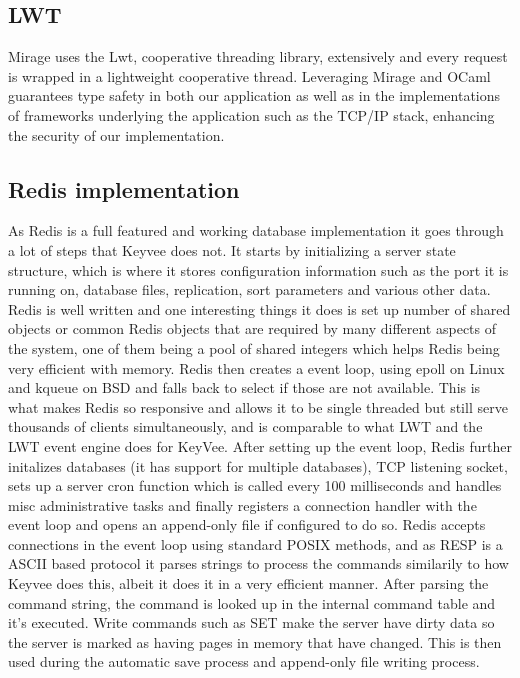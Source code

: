 \documentclass[english,10pt,twocolumn]{article}
\begin{document}
\subsection{LWT}

Mirage uses the Lwt, cooperative threading library, extensively and every request is wrapped in a lightweight cooperative thread. Leveraging Mirage and OCaml guarantees type safety in both our application as well as in the implementations of frameworks underlying the application such as the TCP/IP stack, enhancing the security of our implementation.


\subsection{Redis implementation}

As Redis is a full featured and working database implementation it goes through a lot of steps that Keyvee does not.
It starts by initializing a server state structure, which is where it stores configuration information such as the port it is running on, database files, replication, sort parameters and various other data.
Redis is well written and one interesting things it does is set up number of shared objects or common Redis objects that are required by many different aspects of the system, one of them being a pool of shared integers which helps Redis being very efficient with memory.
Redis then creates a event loop, using epoll on Linux and kqueue on BSD and falls back to select if those are not available.
This is what makes Redis so responsive and allows it to be single threaded but still serve thousands of clients simultaneously, and is comparable to what LWT and the LWT event engine does for KeyVee.
After setting up the event loop, Redis further initalizes databases (it has support for multiple databases), TCP listening socket, sets up a server cron function which is called every 100 milliseconds and handles misc administrative tasks and finally registers a connection handler with the event loop and opens an append-only file if configured to do so.
Redis accepts connections in the event loop using standard POSIX methods, and as RESP is a ASCII based protocol it parses strings to process the commands similarily to how Keyvee does this, albeit it does it in a very efficient manner.
After parsing the command string, the command is looked up in the internal command table and it's executed.
Write commands such as SET make the server have dirty data so the server is marked as having pages in memory that have changed.
This is then used during the automatic save process and append-only file writing process.
\end{document}
